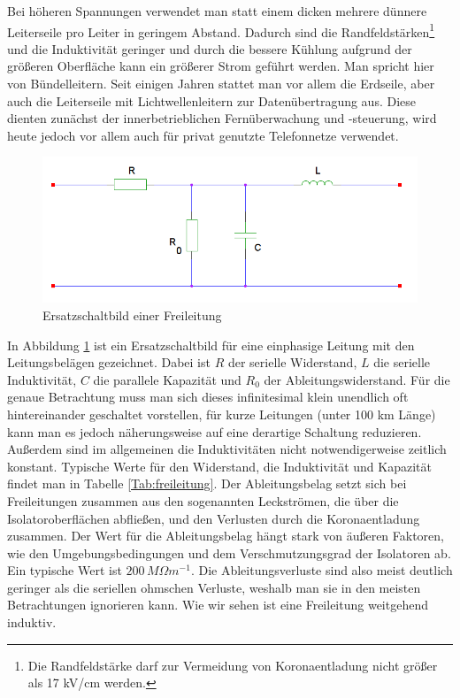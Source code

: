 Bei höheren Spannungen verwendet man statt einem dicken mehrere dünnere Leiterseile pro Leiter in geringem Abstand. Dadurch sind die Randfeldstärken\footnote{Die Randfeldstärke darf zur Vermeidung von Koronaentladung nicht größer als 17 kV/cm werden.\cite{Flosdorff}} und die Induktivität geringer und durch die bessere Kühlung aufgrund der größeren Oberfläche kann ein größerer Strom geführt werden. Man spricht hier von Bündelleitern.
Seit einigen Jahren stattet man vor allem die Erdseile, aber auch die Leiterseile mit Lichtwellenleitern zur Datenübertragung aus. Diese dienten zunächst der innerbetrieblichen Fernüberwachung und -steuerung, wird heute jedoch vor allem auch für privat genutzte Telefonnetze verwendet.\cite{Flosdorff}

\begin{figure}[tbhn]
\begin{center}
\noindent
\includegraphics[scale=0.5]{freileitung.png}
\end{center}
\caption{Ersatzschaltbild einer Freileitung} %
\label{pic:Ersatzschaltbildfreileitung}
\end{figure}

In Abbildung \ref{pic:Ersatzschaltbildfreileitung} ist ein Ersatzschaltbild für eine einphasige Leitung mit den Leitungsbelägen gezeichnet.
Dabei ist $R$ der serielle Widerstand, $L$ die serielle Induktivität, $C$ die parallele Kapazität und $R_0$ der Ableitungswiderstand. Für die genaue Betrachtung muss man sich dieses infinitesimal klein unendlich oft hintereinander geschaltet vorstellen, für kurze Leitungen (unter 100 km Länge) kann man es jedoch näherungsweise auf eine derartige Schaltung reduzieren\cite{Harrison}.
Außerdem sind im allgemeinen die Induktivitäten nicht notwendigerweise zeitlich konstant\cite{Flosdorff}.
Typische Werte für den Widerstand, die Induktivität und Kapazität findet man in Tabelle \ref{Tab:freileitung}.
Der Ableitungsbelag setzt sich bei Freileitungen zusammen aus den sogenannten Leckströmen, die über die Isolatoroberflächen abfließen, und den Verlusten durch die Koronaentladung zusammen.\cite{Heuck}
Der Wert für die Ableitungsbelag hängt stark von äußeren Faktoren, wie den Umgebungsbedingungen und dem Verschmutzungsgrad der Isolatoren ab. Ein typische Wert ist $200\,M\Omega m^{-1}$.\cite{Harrison} Die Ableitungsverluste sind also meist deutlich geringer als die seriellen ohmschen Verluste, weshalb man sie in den meisten Betrachtungen ignorieren kann.
Wie wir sehen ist eine Freileitung weitgehend induktiv. %


